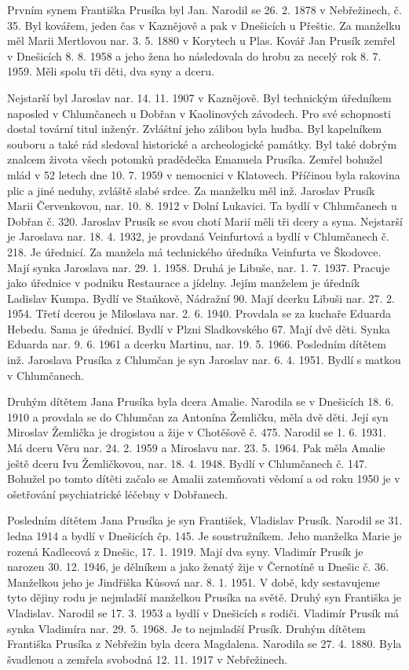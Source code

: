 \documentclass[../dejiny-rodu-prusiku.tex]{subfiles}
\begin{document}
Prvním synem Františka Prusíka byl Jan. Narodil se 26. 2. 1878 v Nebřežinech, č. 35. Byl kovářem, jeden čas v Kaznějově a pak v Dnešicích u Přeštic. Za manželku měl Marii Mertlovou nar. 3. 5. 1880 v Korytech u Plas. Kovář Jan Prusík zemřel v Dnešicích 8. 8. 1958 a jeho žena ho následovala do hrobu za necelý rok 8. 7. 1959. Měli spo­lu tři děti, dva syny a dceru.

Nejstarší byl Jaroslav nar. 14. 11. 1907 v Kaznějově. Byl technickým úředníkem naposled v Chlumčanech u Dobřan v Kaolinových závodech. Pro své schopnosti dostal tovární titul inženýr. Zvláštní jeho zálibou byla hudba. Byl kapelníkem souboru a také rád sledoval historické a archeologické památky. Byl také dobrým znalcem života všech potomků pradědečka Emanuela Prusíka. Zemřel bohu­žel mlád v 52 letech dne 10. 7. 1959 v nemocnici v Klatovech. Příčinou byla rakovina plic a jiné neduhy, zvláště slabé srdce. Za manželku měl inž. Jaroslav Prusík Marii
Červenkovou, nar. 10. 8. 1912 v Dolní Lukavici. Ta bydlí v Chlumčanech u Dobřan č. 320. Jaroslav Prusík se svou chotí Marií měli tři dcery a syna. Nejstarší je Jaroslava nar. 18. 4. 1932, je provdaná Veinfurtová a bydlí v Chlumčanech č. 218. Je úřednicí. Za manžela má technického úředníka Veinfurta ve Škodovce. Mají synka Jaroslava nar. 29. 1. 1958. Druhá je Libuše, nar. 1. 7. 1937. Pracuje jako úřednice v podniku Restaurace a jídelny. Jejím manželem je úředník Ladislav Kumpa. Bydlí ve Staňkově, Nádražní 90. Mají dcerku Libuši nar. 27. 2. 1954. Třetí dcerou je Miloslava nar. 2. 6. 1940. Provdala se za kuchaře Eduarda Hebedu. Sama je úředni­cí. Bydlí v Plzni Sladkovského 67.  Mají dvě děti. Synka Eduarda nar. 9. 6. 1961 a dcerku Martinu, nar. 19. 5. 1966. Posledním dítětem inž. Jaroslava Prusíka z Chlumčan je syn Jaroslav nar. 6. 4. 1951. Bydlí s matkou v Chlumčanech.

Druhým dítětem Jana Prusíka byla dcera Amalie. Narodila se v Dnešicích 18. 6. 1910 a provdala se do Chlumčan za Antonína Žemličku, měla dvě děti. Její syn Miroslav Žemlička je drogistou a žije v Chotěšově č. 475. Narodil se 1. 6. 1931. Má dceru Věru nar. 24. 2. 1959 a Mirosla­vu nar. 23. 5. 1964. Pak měla Amalie ještě dceru Ivu Žemličkovou, nar. 18. 4. 1948. Bydlí v Chlumčanech č. 147. Bohužel po tomto dítěti začalo se Amalii zatemňovati vědomí a od roku 1950 je v ošetřování psychiatrické léčeb­ny v Dobřanech.

Posledním dítětem Jana Prusíka je syn František, Vladislav Prusík. Narodil se 31. ledna 1914 a bydlí v Dnešicích čp. 145. Je soustružníkem. Jeho manželka Marie je rozená Kadlecová z Dnešic, 17. 1. 1919. Mají dva syny. Vladimír Prusík je narozen 30. 12. 1946, je dělníkem a jako ženatý žije v Černotíně u Dnešic č. 36. Manželkou jeho je Jindřiška Kůsová nar. 8. 1. 1951. V době, kdy sestavujeme tyto dějiny rodu je nejmladší manželkou Pru­síka na světě. Druhý syn Františka je Vladislav. Narodil se 17. 3. 1953 a bydlí v Dnešicích s rodiči. Vladimír Prusík má synka Vladimíra nar. 29. 5. 1968. Je to nejmladší Prusík. Druhým dítětem Františka Prusíka z Nebřežin byla dcera Magdalena. Narodila se 27. 4. 1880. Byla švadlenou a zemře­la svobodná 12. 11. 1917 v Nebřežinech.
\end{document}
